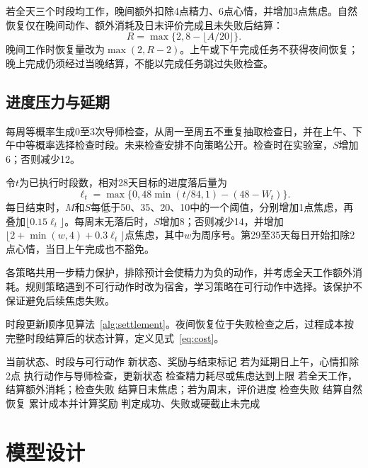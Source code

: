 \documentclass[journal]{IEEEtran}
\begin{document}
若全天三个时段均工作，晚间额外扣除4点精力、6点心情，并增加3点焦虑。自然恢复仅在晚间动作、额外消耗及日末评价完成且未失败后结算：
\begin{equation}
R=\max\{2,8-\lfloor A/20\rfloor\}.
\end{equation}
晚间工作时恢复量改为$\max(2,R-2)$。上午或下午完成任务不获得夜间恢复；晚上完成仍须经过当晚结算，不能以完成任务跳过失败检查。

\subsection{进度压力与延期}

每周等概率生成0至3次导师检查，从周一至周五不重复抽取检查日，并在上午、下午中等概率选择检查时段。未来检查安排不向策略公开。检查时在实验室，$S$增加6；否则减少12。

令$t$为已执行时段数，相对28天目标的进度落后量为
\begin{equation}
\ell_t=\max\{0,48\min(t/84,1)-(48-W_t)\}.
\end{equation}
每日结束时，$M$和$S$每低于50、35、20、10中的一个阈值，分别增加1点焦虑，再叠加$\lfloor0.15\ell_t\rfloor$。每周末无落后时，$S$增加8；否则减少14，并增加$\lfloor2+\min(w,4)+0.3\ell_t\rfloor$点焦虑，其中$w$为周序号。第29至35天每日开始扣除2点心情，当日上午完成也不豁免。

各策略共用一步精力保护，排除预计会使精力为负的动作，并考虑全天工作额外消耗。规则策略遇到不可行动作时改为宿舍，学习策略在可行动作中选择。该保护不保证避免后续焦虑失败。

时段更新顺序见算法~\ref{alg:settlement}。夜间恢复位于失败检查之后，过程成本按完整时段结算后的状态计算，定义见式~\eqref{eq:cost}。

\begin{algorithm}[H]
\caption{单个时段的状态更新与结算}
\label{alg:settlement}
\footnotesize
\begin{algorithmic}[1]
\Require 当前状态、时段与可行动作
\Ensure 新状态、奖励与结束标记
\State 若为延期日上午，心情扣除2点
\State 执行动作与导师检查，更新状态
\State 检查精力耗尽或焦虑达到上限
    \State 若全天工作，结算额外消耗；检查失败
        \State 结算日末焦虑；若为周末，评价进度
        \State 检查失败
            \State 结算自然恢复
        \EndIf
    \EndIf
\EndIf
\State 累计成本并计算奖励
\State 判定成功、失败或硬截止未完成
\end{algorithmic}
\end{algorithm}

\section{模型设计}
\end{document}

